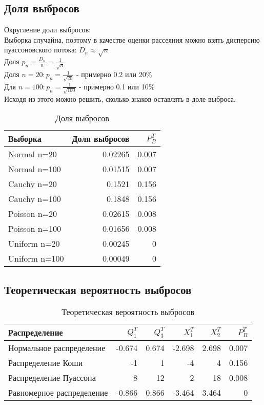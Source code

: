 \documentclass[a4paper]{article}
\begin{document}
\subsection{Доля выбросов}
\noindent Округление доли выбросов:\\
Выборка случайна, поэтому в качестве оценки рассеяния можно взять дисперсию пуассоновского потока:  $D_n \approx \sqrt{n}$\\
Доля $p_n = \frac{D_n}{n}=\frac{1}{\sqrt{n}}$\\
Доля $n=20: p_n=\frac{1}{\sqrt{20}}$ - примерно 0.2 или 20\% \\
Для $n=100: p_n=\frac{1}{\sqrt{100}}$ - примерно 0.1 или 10\% \\
Исходя из этого можно решить, сколько знаков оставлять в доле выброса.
\begin{table}[H]
		\centering
		\begin{tabular}[t]{lrr}
			\hline
			Выборка   &      Доля выбросов	& $P_B^T$		\\
			\hline
			Normal n=20   	&	0.02265 	& 0.007\\
			Normal n=100   	&  	0.01515		& 0.007\\
			Cauchy n=20 	& 	0.1521  	& 0.156\\
			Cauchy n=100	&  	0.1848 		& 0.156\\
			Poisson n=20	&	0.02615 	& 0.008\\
			Poisson n=100	&	0.01656		& 0.008\\
			Uniform n=20	&	0.00245 	& 0 	\\
			Uniform n=100	&	0.00049 	& 0	    \\
			\hline
		\end{tabular}
		\caption{Доля выбросов}
		\label{tab:normal}
	\end{table}


\subsection{Теоретическая вероятность выбросов}
\begin{table}[H]
		\centering
		\begin{tabular}[t]{lrrrrr}
			\hline
			Распределение   &      $Q_1^T$	& $Q_3^T$ & $X_1^T$ & $X_2^T$ & $P_B^T$	\\
			\hline
			Нормальное распределение 	& -0.674& 0.674 & -2.698 	&  2.698 	& 0.007 \\
			Распределение Коши 			& -1	& 1		&  -4		& 4			& 0.156 \\
			Распределение Пуассона 		& 8		& 12	& 2			& 18		& 0.008 \\
			Равномерное распределение 	&-0.866 & 0.866	& -3.464 	& 3.464 	& 0	\\
			
			\hline
		\end{tabular}
		\caption{Теоретическая вероятность выбросов}
		\label{tab:normal}
	\end{table}
\end{document}

